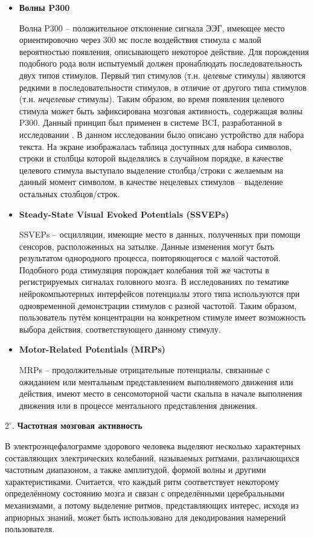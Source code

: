 \documentclass[12pt,fleqn]{article}
\begin{document}
	\begin{itemize}
	\item
	{\bf Волны P300}
	\par Волна P300 -- положительное отклонение сигнала ЭЭГ, имеющее место ориентировочно через 300 мс после воздействия стимула с малой вероятностью появления, описывающего некоторое действие. Для порождения подобного рода волн испытуемый должен пронаблюдать последовательность двух типов стимулов. Первый тип стимулов (т.н. {\it целевые} стимулы) являются редкими в последовательности стимулов, в отличие от другого типа стимулов (т.н. {\it нецелевые} стимулы). Таким образом, во время появления целевого стимула может быть зафиксирована мозговая активность, содержащая волны P300. Данный принцип был применен в системе BCI, разработанной в исследовании \cite{Farwell_Donchin}. В данном исследовании было описано устройство для набора текста. На экране изображалась таблица доступных для набора символов, строки и столбцы которой выделялись в случайном порядке, в качестве целевого стимула выступало выделение столбца/строки с желаемым на данный момент символом, в качестве нецелевых стимулов -- выделение остальных столбцов/строк.
	\item
	{\bf Steady-State Visual Evoked Potentials (SSVEPs)}
	\par SSVEPs -- осцилляции, имеющие место в данных, полученных при помощи сенсоров, расположенных на затылке. Данные изменения могут быть результатом однородного процесса, повторяющегося с малой частотой. Подобного рода стимуляция порождает колебания той же частоты в регистрируемых сигналах головного мозга. В исследованиях по тематике нейрокомпьютерных интерфейсов потенциалы этого типа используются при одновременной демонстрации стимулов с разной частотой. Таким образом, пользователь путём концентрации на конкретном стимуле имеет возможность выбора действия, соответствующего данному стимулу.\\
	\item
	{\bf Motor-Related Potentials (MRPs)}
	\par MRPs -- продолжительные отрицательные потенциалы, связанные с ожиданием или ментальным представлением выполняемого движения или действия, имеют место в сенсомоторной части скальпа в начале выполнения движения или в процессе ментального представления движения.
	\end{itemize}
	\par $2^{\circ}.$ {\bf Частотная мозговая активность}
	\par В электроэнцефалограмме здорового человека выделяют несколько характерных составляющих электрических колебаний, называемых ритмами, различающихся частотным диапазоном, а также амплитудой, формой волны и другими характеристиками. Считается, что каждый ритм соответствует некоторому определённому состоянию мозга и связан с определёнными церебральными механизмами, а потому выделение ритмов, представляющих интерес, исходя из априорных знаний, может быть использовано для декодирования намерений пользователя.
\end{document}
